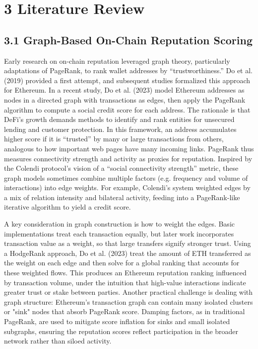 \clearpage
{}
\section*{3 \textbf{Literature Review}}
\label{sec:literature-review}

\subsection*{3.1 Graph-Based On-Chain Reputation Scoring}
\label{sec:graph-based-on-chain-reputation-scoring}

Early research on on-chain reputation leveraged graph theory, particularly adaptations of PageRank, to rank wallet addresses by ``trustworthiness.'' Do et al. (2019) provided a first attempt, and subsequent studies formalized this approach for Ethereum. In a recent study, Do et al. (2023) model Ethereum addresses as nodes in a directed graph with transactions as edges, then apply the PageRank algorithm to compute a social credit score for each address. The rationale is that DeFi's growth demands methods to identify and rank entities for unsecured lending and customer protection. In this framework, an address accumulates higher score if it is ``trusted'' by many or large transactions from others, analogous to how important web pages have many incoming links. PageRank thus measures connectivity strength and activity as proxies for reputation. Inspired by the Colendi protocol's vision of a ``social connectivity strength'' metric, these graph models sometimes combine multiple factors (e.g. frequency and volume of interactions) into edge weights. For example, Colendi's system weighted edges by a mix of relation intensity and bilateral activity, feeding into a PageRank-like iterative algorithm to yield a credit score.


A key consideration in graph construction is how to weight the edges. Basic implementations treat each transaction equally, but later work incorporates transaction value as a weight, so that large transfers signify stronger trust. Using a HodgeRank approach, Do et al. (2023) treat the amount of ETH transferred as the weight on each edge and then solve for a global ranking that accounts for these weighted flows. This produces an Ethereum reputation ranking influenced by transaction volume, under the intuition that high-value interactions indicate greater trust or stake between parties. Another practical challenge is dealing with graph structure: Ethereum's transaction graph can contain many isolated clusters or "sink" nodes that absorb PageRank score. Damping factors, as in traditional PageRank, are used to mitigate score inflation for sinks and small isolated subgraphs, ensuring the reputation scores reflect participation in the broader network rather than siloed activity.


